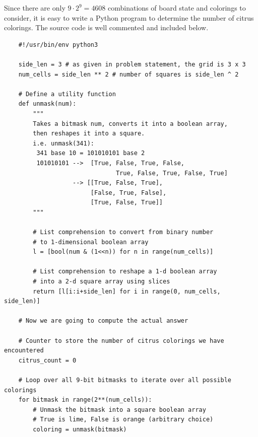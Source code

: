\documentclass[12pt]{article}
\begin{document}
\begin{solution}{2}
    Since there are only $9 \cdot 2^9 = 4608$ combinations of board state and colorings
    to consider, it is easy to write a Python program to determine the number of
    citrus colorings. The source code is well commented and included below.
    
     
     
\lstset{style=prob2}
\begin{lstlisting}
    #!/usr/bin/env python3
    
    side_len = 3 # as given in problem statement, the grid is 3 x 3
    num_cells = side_len ** 2 # number of squares is side_len ^ 2
    
    # Define a utility function
    def unmask(num):
        """
        Takes a bitmask num, converts it into a boolean array,
        then reshapes it into a square.
        i.e. unmask(341):
         341 base 10 = 101010101 base 2
         101010101 -->  [True, False, True, False,
                               True, False, True, False, True]
                   --> [[True, False, True],
                        [False, True, False],
                        [True, False, True]]
        """
        
        # List comprehension to convert from binary number
        # to 1-dimensional boolean array
        l = [bool(num & (1<<n)) for n in range(num_cells)]
      
        # List comprehension to reshape a 1-d boolean array
        # into a 2-d square array using slices
        return [l[i:i+side_len] for i in range(0, num_cells, side_len)]
    
    # Now we are going to compute the actual answer
      
    # Counter to store the number of citrus colorings we have encountered
    citrus_count = 0
    
    # Loop over all 9-bit bitmasks to iterate over all possible colorings
    for bitmask in range(2**(num_cells)):
        # Unmask the bitmask into a square boolean array
        # True is lime, False is orange (arbitrary choice)
        coloring = unmask(bitmask)
      

\end{lstlisting}
\end{solution}
\end{document}
